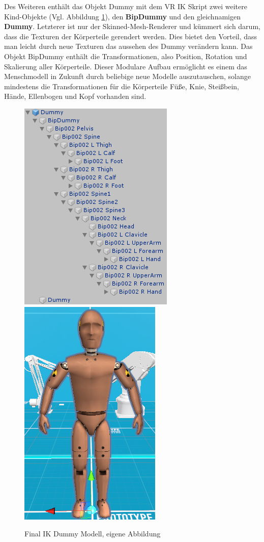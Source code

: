 \newline
Des Weiteren enthält das Objekt Dummy mit dem VR IK Skript zwei weitere Kind-Objekte (Vgl. Abbildung \ref{fig:Dummy}), den \textbf{BipDummy} und den gleichnamigen \textbf{Dummy}. Letzterer ist nur der Skinned-Mesh-Renderer und kümmert sich darum, dass die Texturen der Körperteile gerendert werden. Dies bietet den Vorteil, dass man leicht durch neue Texturen das aussehen des Dummy verändern kann. Das Objekt BipDummy enthält die Transformationen, also Position, Rotation und Skalierung aller Körperteile. Dieser Modulare Aufbau ermöglicht es einem das Menschmodell in Zukunft durch beliebige neue Modelle auszutauschen, solange mindestens die Transformationen für die Körperteile Füße, Knie, Steißbein, Hände, Ellenbogen und Kopf vorhanden sind.
\begin{figure}[h]
	\centering
	\includegraphics[width=0.35\linewidth]{Bilder/A34_DummyAufbau}
	\includegraphics[width=0.296\linewidth]{Bilder/A35_Dummy}
	\caption{Final IK Dummy Modell, eigene Abbildung}
	\label{fig:Dummy}
\end{figure}

